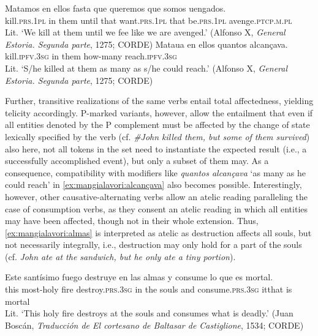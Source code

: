 \documentclass[output=paper,colorlinks,citecolor=brown,
]{langscibook}
\begin{document}
\ea
  \ea \label{ex:mangialavori:300}
    \gll Matamos en ellos fasta que queremos que somos  uengados.\\
kill.\textsc{prs}.\textsc{1pl} in them until that want.\textsc{prs}.\textsc{1pl} that be.\textsc{prs}.\textsc{1pl} avenge.\textsc{ptcp}.\textsc{m}.\textsc{pl}\\
    \glt Lit. ‘We kill at them until we fee like we are avenged.’ (Alfonso X, \textit{General Estoria. Segunda parte}, 1275; CORDE)
  \ex \label{ex:mangialavori:alcançava}
    \gll Mataua en ellos quantos alcançava.\\
kill.\textsc{ipfv}.\textsc{3sg} in them how-many reach.\textsc{ipfv}.\textsc{3sg}\\
    \glt Lit. ‘S/he killed at them as many as s/he could reach.’ (Alfonso X, \textit{General Estoria. Segunda parte}, 1275; CORDE) 
  \z 
\z 

Further, transitive realizations of the same verbs entail total affectedness, yielding telicity accordingly. P-marked variants, however, allow the entailment that even if all entities denoted by the P complement must be affected by the change of state lexically specified by the verb (cf. \textit{\#John killed them, but some of them survived}) also here, not all tokens in the set need to instantiate the expected result (i.e., a successfully accomplished event), but only a subset of them may. As a consequence, compatibility with modifiers like \textit{quantos alcançava} ‘as many as he could reach’ in  \ref{ex:mangialavori:alcançava} also becomes possible. Interestingly, however, other causative-alternating verbs allow an atelic reading paralleling the case of consumption verbs, as they consent an atelic reading in which all entities may have been affected, though not in their whole extension. Thus,  \ref{ex:mangialavori:almas} is interpreted as atelic as destruction affects all souls, but not necessarily integrally, i.e., destruction may only hold for a part of the souls (cf. \textit{John ate at the sandwich, but he only ate a tiny portion}).

\ea\label{ex:mangialavori:almas}
    \gll Este santísimo fuego destruye en las almas y consume lo que es mortal.\\
this most-holy fire destroy.\textsc{prs}.\textsc{3sg} in the souls and consume.\textsc{prs}.\textsc{3sg} itthat is mortal\\
    \glt Lit. ‘This holy fire destroys at the souls and consumes what is deadly.’ (Juan Boscán, \textit{Traducción de El cortesano de Baltasar de Castiglione}, 1534; CORDE) 
\z
\end{document}

